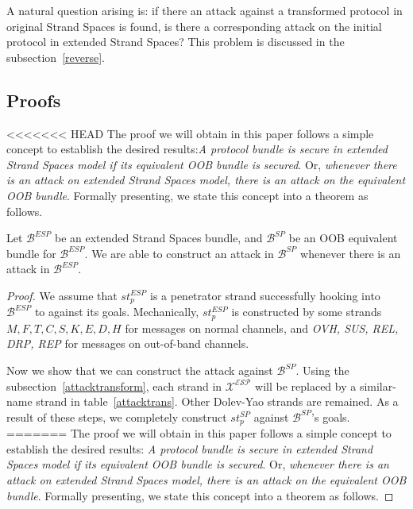 \begin{Definition}
\begin{table}[b]
A natural question arising is: if there an attack against a transformed protocol in original Strand Spaces is found, is there a corresponding attack on the initial protocol in extended Strand Spaces? This problem is discussed in the subsection~\ref{reverse}. 

\subsection{Proofs}\label{proof}

<<<<<<< HEAD
The proof we will obtain in this paper follows a simple concept to establish the desired results:\emph{A protocol bundle is secure in extended Strand Spaces model if its equivalent OOB bundle is secured}. Or, \emph{whenever there is an attack on extended Strand Spaces model, there is an attack on the equivalent OOB bundle}. Formally presenting, we state this concept into a theorem as follows. 

\begin{Theorem}
Let $\mathcal{B}^{ESP}$ be an extended Strand Spaces bundle, and $\mathcal{B}^{SP}$ be an OOB equivalent bundle for $\mathcal{B}^{ESP}$. We are able to construct an attack in $\mathcal{B}^{SP}$ whenever there is an attack in $\mathcal{B}^{ESP}$.
\end{Theorem}

\begin{proof}

We assume that $st^{ESP}_p$ is a penetrator strand successfully hooking into $\mathcal{B}^{ESP}$ to against its goals. Mechanically, $st^{ESP}_p$ is constructed by some strands $M, F, T, C, S, K, E, D, H$ for messages on normal channels, and \emph{OVH, SUS, REL, DRP, REP} for messages on out-of-band channels.

Now we show that we can construct the attack against $\mathcal{B}^{SP}$. Using the subsection~\ref{attacktransform}, each strand in $\mathcal{X^{ESP}}$ will be replaced by a similar-name strand in table~\ref{attacktrans}. Other Dolev-Yao strands are remained. As a result of these steps, we completely construct $st^{SP}_p$ against $\mathcal{B}^{SP}$'s goals. 
=======
The proof we will obtain in this paper follows a simple concept to establish the desired results: \emph{A protocol bundle is secure in extended Strand Spaces model if its equivalent OOB bundle is secured}. Or, \emph{whenever there is an attack on extended Strand Spaces model, there is an attack on the equivalent OOB bundle}. Formally presenting, we state this concept into a theorem as follows. 


\end{proof}
\end{table}
\end{Definition}

